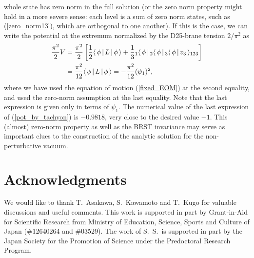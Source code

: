 \documentclass[a4paper,12pt]{article}
\begin{document}
whole state has zero norm in the full solution (or the zero norm
property might hold in a more severe sense:
each level is a sum of zero norm states, such as (\ref{zero_norm13}),
which are orthogonal to one another).
If this is the case, we can write the potential at the extremum
normalized by the D25-brane tension $2/\pi^2$ as
\begin{align}
  \frac{\pi^2}{2}V &
     =  \frac{\pi^2}{2} \left[\frac{1}{2}\langle \, \phi \,|\, L \,|\, \phi\, \rangle
      + \frac{1}{3}{}_1\langle \, \phi \,|\,{}_2\langle \, \phi \,|\, {}_3\langle \, \phi \,|\, v_3\, \rangle_{123}\right] \nonumber\\
    & = \frac{\pi^2}{12}\langle \, \phi \,|\, L \,|\, \phi\, \rangle
      = -\frac{\pi^2}{12} (\psi_1)^2 ,
  \label{pot_by_tachyon}
\end{align}
where we have used the equation of motion (\ref{fixed_EOM}) at the
second equality, and used the zero-norm assumption at the last
equality.
Note that the last expression is given only in terms of $\psi_1$.
The numerical value of the last expression of (\ref{pot_by_tachyon})
is $-0.9818$, very close to the desired value $-1$.
This (almost) zero-norm property as well as the BRST invariance may
serve as important clues to the construction of the analytic solution
for the non-perturbative vacuum.

\section*{Acknowledgments}
We would like to thank T.\ Asakawa, S.\ Kawamoto and T.\ Kugo for
valuable discussions and useful comments.
This work is supported in part by Grant-in-Aid for Scientific Research
from Ministry of Education, Science, Sports and Culture of Japan
(\#12640264 and \#03529).
The work of S.\ S.\ is supported in part by the Japan Society for the
Promotion of Science under the Predoctoral Research Program.
\end{document}
